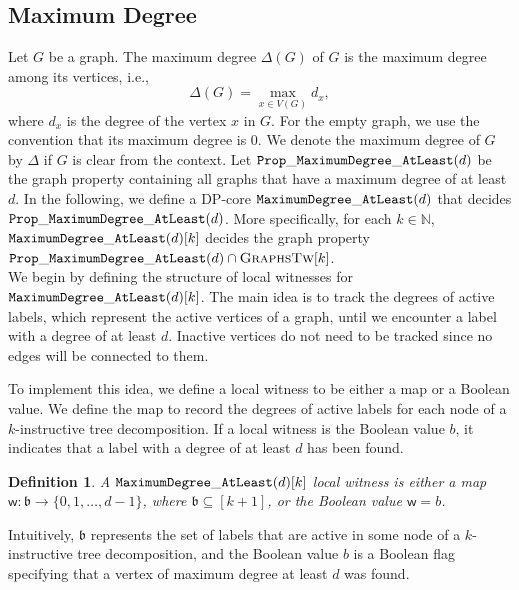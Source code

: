 \documentclass[11pt,a4paper]{article}
\newtheorem{definition}[theorem]{Definition}
\newcommand{\treewidthvalue}{k}
\newcommand{\maxDegree}{\Delta}
\newcommand{\agraph}{G}
\newcommand{\N}{\mathbb{N}}
\newcommand{\abag}{\mathfrak{b}}
\newcommand{\vertexset}[1]{V(#1)}
\newcommand{\awitness}{\mathsf{w}}
\newcommand{\dpcore}{\mathsf{D}}
\newcommand{\allgraphstreewidth}[1]{\textsc{GraphsTw}[#1]}
\newcommand{\dpNamePart}[1]{\mbox{\normalfont\ttfamily #1}}
\newcommand{\maxDegreeAtLeastProperty}[1]{\dpNamePart{Prop}\_\allowbreak\dpNamePart{MaximumDegree}\_\allowbreak\dpNamePart{AtLeast}(#1)}
\newcommand{\maxDegreeAtLeastCore}[1]{\dpNamePart{MaximumDegree}\_\allowbreak\dpNamePart{AtLeast}(#1)}
\newcommand{\xvertex}{x}
\newcommand{\maxdegreeparameter}{d}
\newcommand{\maxdegreefound}{b}
\begin{document}
\subsection{Maximum Degree}
{
\renewcommand{\dpcore}{\maxDegreeAtLeastCore{\maxdegreeparameter}}

Let $\agraph$ be a graph. The maximum degree $\maxDegree(\agraph)$ of $\agraph$ is the maximum degree among its vertices, i.e.,
\[
\maxDegree(\agraph)=\max_{\xvertex  \in \vertexset{\agraph}} d_\xvertex,
\]
where $d_\xvertex$ is the degree of the vertex $\xvertex$ in $\agraph$. For the empty graph, we use the convention that its maximum degree is $0$. We denote the maximum degree of $\agraph$ by $\maxDegree$ if $\agraph$ is clear from the context. Let $\maxDegreeAtLeastProperty{\maxdegreeparameter}$ be the graph property containing all graphs that have a maximum degree of at least $\maxdegreeparameter$. In the following, we define a DP-core $\dpcore$ that decides $\maxDegreeAtLeastProperty{\maxdegreeparameter}$. More specifically, for each $\treewidthvalue \in \N$, $\dpcore[\treewidthvalue]$ decides the graph property $\maxDegreeAtLeastProperty{\maxdegreeparameter} \cap \allgraphstreewidth{\treewidthvalue}$.
\\

 We begin by defining the structure of local witnesses for $\dpcore[\treewidthvalue]$. The main idea is to track the degrees of active labels, which represent the active vertices of a graph, until we encounter a label with a degree of at least $\maxdegreeparameter$. Inactive vertices do not need to be tracked since no edges will be connected to them.

To implement this idea, we define a local witness to be either a map or a Boolean value. We define the map to record the degrees of active labels for each node of a $\treewidthvalue$-instructive tree decomposition. If a local witness is the Boolean value $\maxdegreefound$, it indicates that a label with a degree of at least $\maxdegreeparameter$ has been found.

\begin{definition}
A $\dpcore[\treewidthvalue]$ local witness is either a map $\awitness:\abag \to \{0,1,\dots,\maxdegreeparameter-1\}$, where $\abag \subseteq [\treewidthvalue+1]$, or the Boolean value $\awitness = \maxdegreefound$.
\end{definition}

Intuitively, $\abag$ represents the set of labels that are active in some node of a $\treewidthvalue$-instructive tree decomposition, and the Boolean value $\maxdegreefound$ is a Boolean flag specifying that a vertex of maximum degree at least $\maxdegreeparameter$ was found.

}
\end{document}
